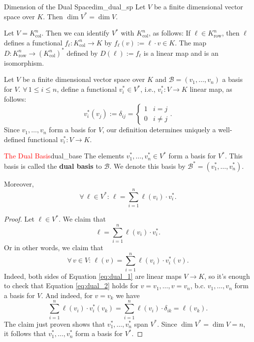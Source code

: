 \begin{corollary}{Dimension of the Dual Space}{dim_dual_sp}
	Let $V$ be a finite dimensional vector space over $K$. Then $\dim V^* = \dim V$.
\end{corollary}

Let $V = K^n_{\text{col}}$. Then we can identify $V^*$ with $K^n_{\text{col}}$, as follows: If $\ell \in K^n_{\text{row}}$, then $\ell$ defines a functional $f_{\ell}:K^n_{\text{col}} \to K$ by $f_{\ell}(v) := \ell \cdot v \in K$. The map $D:K^n_{\text{row}} \to (K^n_{\text{col}})^*$ defined by $D(\ell) := f_{\ell}$ is a linear map and is an isomorphism.

Let $V$ be a finite dimensional vector space over $K$ and $\mathcal{B} = (v_1, \hdots , v_n)$ a basis for $V$. $\forall \, 1 \leq i \leq n$, define a functional $v_i^* \in V^*$, i.e., $v_i^*:V \to K$ linear map, as follows:
\[
	v_i^*(v_j) := \delta_{ij} = \begin{cases}
		1 & i = j\\
		0 & i \neq j
	\end{cases}.
\]
Since $v_1, \hdots , v_n$ form a basis for $V$, our definition determines uniquely a well-defined functional $v_i^*:V \to K$.

\begin{lemma}{\textcolor{red}{The Dual Basis}}{dual_base}
	The elements $v_1^*, \hdots , v_n^* \in V^*$ form a basis for $V^*$. This basis is called the \textbf{dual basis} to $\mathcal{B}$. We denote this basis by $\mathcal{B}^* = (v_1^*, \hdots , v_n^*)$.
	
	Moreover,
	\[
		\forall \, \ell  \in V^* : \, \ell = \sum_{i=1}^{n} \ell(v_i)\cdot v_i^*.
	\] 
\end{lemma}

\begin{proof}
	Let $\ell \in V^*$. We claim that 
	\begin{equation}
		\label{eq:dual_1}
		\ell = \sum_{i=1}^{n} \ell(v_i) \cdot v_i^*.
	\end{equation}
	Or in other words, we claim that
	\begin{equation}
		\label{eq:dual_2}
		\forall \, v \in V: \, \ell(v) = \sum_{i=1}^{n} \ell(v_i) \cdot v_i^*(v).
	\end{equation}
	Indeed, both sides of Equation \eqref{eq:dual_1} are linear maps $V \to K$, so it's enough to check that Equation \eqref{eq:dual_2} holds for $v = v_1, \hdots , v = v_n$, b.c. $v_1, \hdots , v_n$ form a basis for $V$. And indeed, for $v = v_k$ we have
	\[
	\sum_{i=1}^{n} \ell(v_i)\cdot v_i^*(v_k) = \sum_{i=1}^{n} \ell(v_i)\cdot \delta_{ik} = \ell(v_k).
	\]
	The claim just proven shows that $v_1^*,\hdots , v_n^*$ span $V^*$. Since $\dim V^* = \dim V = n$, it follows that $v_1^*, \hdots , v_n^*$ form a basis for $V^*$.
\end{proof}

